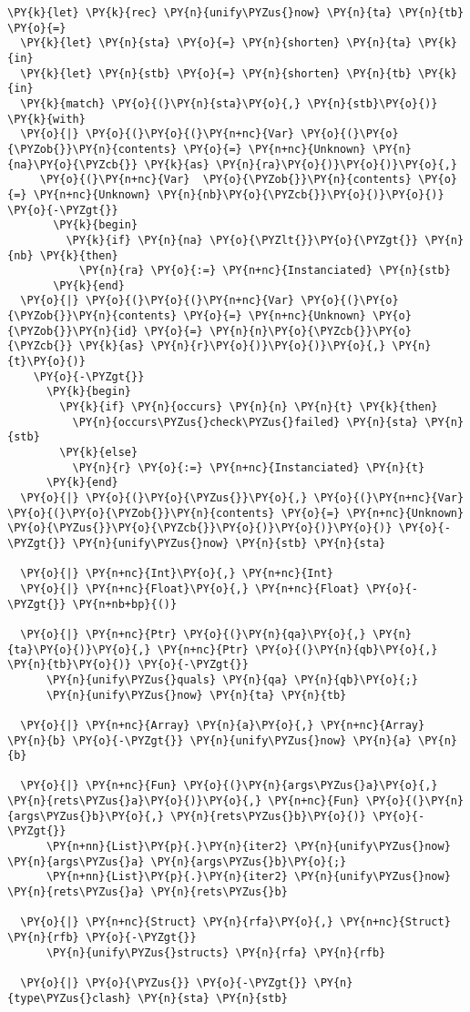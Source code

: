 \begin{Verbatim}[commandchars=\\\{\}]
\PY{k}{let} \PY{k}{rec} \PY{n}{unify\PYZus{}now} \PY{n}{ta} \PY{n}{tb} \PY{o}{=}
  \PY{k}{let} \PY{n}{sta} \PY{o}{=} \PY{n}{shorten} \PY{n}{ta} \PY{k}{in}
  \PY{k}{let} \PY{n}{stb} \PY{o}{=} \PY{n}{shorten} \PY{n}{tb} \PY{k}{in}
  \PY{k}{match} \PY{o}{(}\PY{n}{sta}\PY{o}{,} \PY{n}{stb}\PY{o}{)} \PY{k}{with}
  \PY{o}{|} \PY{o}{(}\PY{o}{(}\PY{n+nc}{Var} \PY{o}{(}\PY{o}{\PYZob{}}\PY{n}{contents} \PY{o}{=} \PY{n+nc}{Unknown} \PY{n}{na}\PY{o}{\PYZcb{}} \PY{k}{as} \PY{n}{ra}\PY{o}{)}\PY{o}{)}\PY{o}{,}
     \PY{o}{(}\PY{n+nc}{Var}  \PY{o}{\PYZob{}}\PY{n}{contents} \PY{o}{=} \PY{n+nc}{Unknown} \PY{n}{nb}\PY{o}{\PYZcb{}}\PY{o}{)}\PY{o}{)} \PY{o}{-\PYZgt{}}
       \PY{k}{begin}
         \PY{k}{if} \PY{n}{na} \PY{o}{\PYZlt{}}\PY{o}{\PYZgt{}} \PY{n}{nb} \PY{k}{then}
           \PY{n}{ra} \PY{o}{:=} \PY{n+nc}{Instanciated} \PY{n}{stb}
       \PY{k}{end}
  \PY{o}{|} \PY{o}{(}\PY{o}{(}\PY{n+nc}{Var} \PY{o}{(}\PY{o}{\PYZob{}}\PY{n}{contents} \PY{o}{=} \PY{n+nc}{Unknown} \PY{o}{\PYZob{}}\PY{n}{id} \PY{o}{=} \PY{n}{n}\PY{o}{\PYZcb{}}\PY{o}{\PYZcb{}} \PY{k}{as} \PY{n}{r}\PY{o}{)}\PY{o}{)}\PY{o}{,} \PY{n}{t}\PY{o}{)}
    \PY{o}{-\PYZgt{}}
      \PY{k}{begin}
        \PY{k}{if} \PY{n}{occurs} \PY{n}{n} \PY{n}{t} \PY{k}{then}
          \PY{n}{occurs\PYZus{}check\PYZus{}failed} \PY{n}{sta} \PY{n}{stb}
        \PY{k}{else}
          \PY{n}{r} \PY{o}{:=} \PY{n+nc}{Instanciated} \PY{n}{t}
      \PY{k}{end}
  \PY{o}{|} \PY{o}{(}\PY{o}{\PYZus{}}\PY{o}{,} \PY{o}{(}\PY{n+nc}{Var} \PY{o}{(}\PY{o}{\PYZob{}}\PY{n}{contents} \PY{o}{=} \PY{n+nc}{Unknown} \PY{o}{\PYZus{}}\PY{o}{\PYZcb{}}\PY{o}{)}\PY{o}{)}\PY{o}{)} \PY{o}{-\PYZgt{}} \PY{n}{unify\PYZus{}now} \PY{n}{stb} \PY{n}{sta}

  \PY{o}{|} \PY{n+nc}{Int}\PY{o}{,} \PY{n+nc}{Int}
  \PY{o}{|} \PY{n+nc}{Float}\PY{o}{,} \PY{n+nc}{Float} \PY{o}{-\PYZgt{}} \PY{n+nb+bp}{()}

  \PY{o}{|} \PY{n+nc}{Ptr} \PY{o}{(}\PY{n}{qa}\PY{o}{,} \PY{n}{ta}\PY{o}{)}\PY{o}{,} \PY{n+nc}{Ptr} \PY{o}{(}\PY{n}{qb}\PY{o}{,} \PY{n}{tb}\PY{o}{)} \PY{o}{-\PYZgt{}}
      \PY{n}{unify\PYZus{}quals} \PY{n}{qa} \PY{n}{qb}\PY{o}{;}
      \PY{n}{unify\PYZus{}now} \PY{n}{ta} \PY{n}{tb}

  \PY{o}{|} \PY{n+nc}{Array} \PY{n}{a}\PY{o}{,} \PY{n+nc}{Array} \PY{n}{b} \PY{o}{-\PYZgt{}} \PY{n}{unify\PYZus{}now} \PY{n}{a} \PY{n}{b}

  \PY{o}{|} \PY{n+nc}{Fun} \PY{o}{(}\PY{n}{args\PYZus{}a}\PY{o}{,} \PY{n}{rets\PYZus{}a}\PY{o}{)}\PY{o}{,} \PY{n+nc}{Fun} \PY{o}{(}\PY{n}{args\PYZus{}b}\PY{o}{,} \PY{n}{rets\PYZus{}b}\PY{o}{)} \PY{o}{-\PYZgt{}}
      \PY{n+nn}{List}\PY{p}{.}\PY{n}{iter2} \PY{n}{unify\PYZus{}now} \PY{n}{args\PYZus{}a} \PY{n}{args\PYZus{}b}\PY{o}{;}
      \PY{n+nn}{List}\PY{p}{.}\PY{n}{iter2} \PY{n}{unify\PYZus{}now} \PY{n}{rets\PYZus{}a} \PY{n}{rets\PYZus{}b}

  \PY{o}{|} \PY{n+nc}{Struct} \PY{n}{rfa}\PY{o}{,} \PY{n+nc}{Struct} \PY{n}{rfb} \PY{o}{-\PYZgt{}}
      \PY{n}{unify\PYZus{}structs} \PY{n}{rfa} \PY{n}{rfb}

  \PY{o}{|} \PY{o}{\PYZus{}} \PY{o}{-\PYZgt{}} \PY{n}{type\PYZus{}clash} \PY{n}{sta} \PY{n}{stb}
\end{Verbatim}
